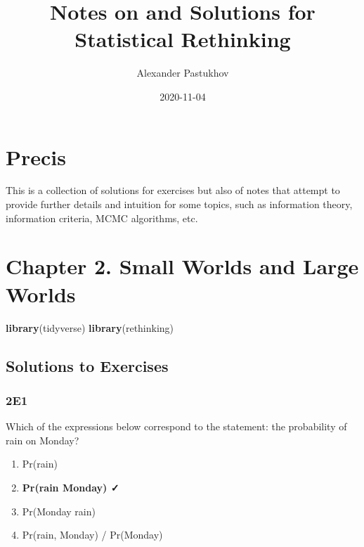 \documentclass[
]{book}
\title{Notes on and Solutions for Statistical Rethinking}
\author{Alexander Pastukhov}
\date{2020-11-04}
\newenvironment{Shaded}{\begin{snugshade}}{\end{snugshade}}
\newcommand{\KeywordTok}[1]{\textcolor[rgb]{0.13,0.29,0.53}{\textbf{#1}}}
\newcommand{\NormalTok}[1]{#1}
\providecommand{\tightlist}{%
  \setlength{\itemsep}{0pt}\setlength{\parskip}{0pt}}
\begin{document}
\maketitle

{
\setcounter{tocdepth}{1}
\tableofcontents
}
\hypertarget{precis}{%
\chapter{Precis}\label{precis}}

This is a collection of solutions for exercises but also of notes that attempt to provide further details and intuition for some topics, such as information theory, information criteria, MCMC algorithms, etc.

\hypertarget{chapter-2.-small-worlds-and-large-worlds}{%
\chapter{Chapter 2. Small Worlds and Large Worlds}\label{chapter-2.-small-worlds-and-large-worlds}}

\begin{Shaded}
\begin{Highlighting}[]
\KeywordTok{library}\NormalTok{(tidyverse)}
\KeywordTok{library}\NormalTok{(rethinking)}
\end{Highlighting}
\end{Shaded}

\hypertarget{solutions-to-exercises}{%
\section{Solutions to Exercises}\label{solutions-to-exercises}}

\hypertarget{e1}{%
\subsection*{2E1}\label{e1}}

Which of the expressions below correspond to the statement: the probability of rain on Monday?

\begin{enumerate}
\def\labelenumi{\arabic{enumi}.}
\tightlist
\item
  Pr(rain)
\item
  \textbf{Pr(rain \textbar{} Monday) ✓}
\item
  Pr(Monday \textbar{} rain)
\item
  Pr(rain, Monday) / Pr(Monday)
\end{enumerate}
\end{document}
